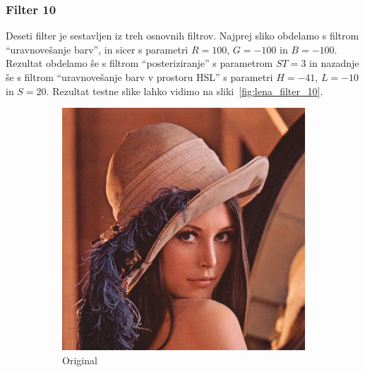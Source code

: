 \documentclass[a4paper, 12pt]{book}
\begin{document}
\subsubsection*{Filter 10}
Deseti filter je sestavljen iz treh osnovnih filtrov. Najprej sliko obdelamo s
filtrom ``uravnovešanje barv'', in sicer s parametri $R = 100$, $G = -100$ in
$B = -100$. Rezultat obdelamo še s filtrom ``posteriziranje'' s parametrom
$ST= 3$ in nazadnje še s filtrom ``uravnovešanje barv v prostoru HSL'' s
parametri $H = -41$, $L = -10$ in $S = 20$. Rezultat testne slike lahko
vidimo na sliki~\ref{fig:lena_filter_10}.

\begin{figure}[!ht]
    \centering
    \begin{subfigure}[b]{0.4\textwidth}
        \includegraphics[width=\textwidth]{lena}
        \caption{Original}
    \end{subfigure}
    \begin{subfigure}[b]{0.4\textwidth}

\end{subfigure}
\end{figure}
\end{document}
